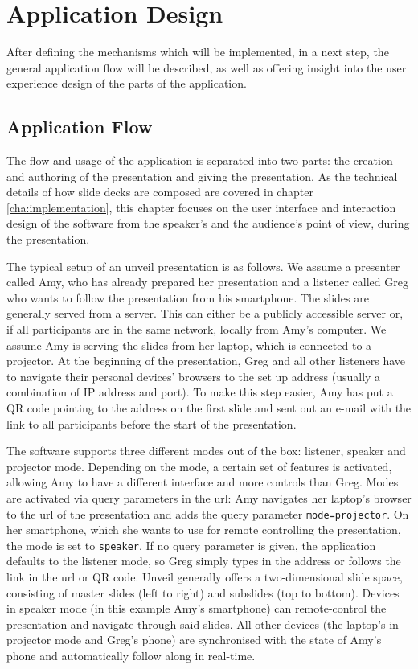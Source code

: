 \chapter{Application Design}
\label{cha:design}

After defining the mechanisms which will be implemented, in a next step, the general application flow will be described, as well as offering insight into the user experience design of the parts of the application.

\section{Application Flow}
The flow and usage of the application is separated into two parts: the creation and authoring of the presentation and giving the presentation. As the technical details of how slide decks are composed are covered in chapter \ref{cha:implementation}, this chapter focuses on the user interface and interaction design of the software from the speaker's and the audience's point of view, during the presentation.

The typical setup of an unveil presentation is as follows. We assume a presenter called Amy, who has already prepared her presentation and a listener called Greg who wants to follow the presentation from his smartphone.
The slides are generally served from a server. This can either be a publicly accessible server or, if all participants are in the same network, locally from Amy's computer. We assume Amy is serving the slides from her laptop, which is connected to a projector.
At the beginning of the presentation, Greg and all other listeners have to navigate their personal devices' browsers to the set up address (usually a combination of IP address and port). To make this step easier, Amy has put a QR code pointing to the address on the first slide and sent out an e-mail with the link to all participants before the start of the presentation.

The software supports three different modes out of the box: listener, speaker and projector mode. Depending on the mode, a certain set of features is activated, allowing Amy to have a different interface and more controls than Greg. Modes are activated via query parameters in the url: Amy navigates her laptop's browser to the url of the presentation and adds the query parameter \texttt{mode=projector}. On her smartphone, which she wants to use for remote controlling the presentation, the mode is set to \texttt{speaker}. If no query parameter is given, the application defaults to the listener mode, so Greg simply types in the address or follows the link in the url or QR code. Unveil generally offers a two-dimensional slide space, consisting of master slides (left to right) and subslides (top to bottom). Devices in speaker mode (in this example Amy's smartphone) can remote-control the presentation and navigate through said slides. All other devices (the laptop's in projector mode and Greg's phone) are synchronised with the state of Amy's phone and automatically follow along in real-time.

